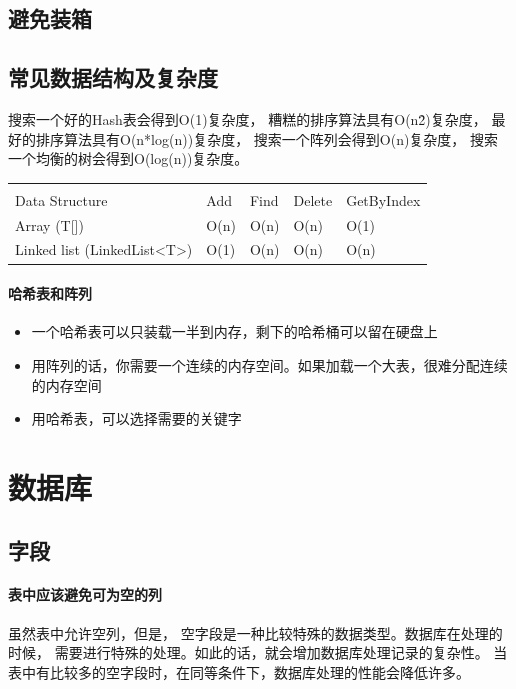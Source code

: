 \documentclass{book}
\begin{document}
\subsection{避免装箱}

\subsection{常见数据结构及复杂度}

搜索一个好的Hash表会得到O(1)复杂度，
糟糕的排序算法具有O(n\^2)复杂度，
最好的排序算法具有O(n*log(n))复杂度，
搜索一个阵列会得到O(n)复杂度，
搜索一个均衡的树会得到O(log(n))复杂度。 

\begin{tabular}{l|l|l|l|l}
	\multirow{1}{*}{}			
	& \multicolumn{1}{c}{}
	& \multicolumn{1}{c}{}
	& \multicolumn{1}{c}{}
	& \multicolumn{1}{c}{}\\
	Data Structure & Add & Find & Delete & GetByIndex\\
	\hline
	Array (T[]) & O(n) & O(n) & O(n) & O(1)\\
	\hline
	Linked list (LinkedList<T>) & O(1) & O(n) & O(n) & O(n)\\
\end{tabular}

\paragraph{哈希表和阵列}

\begin{itemize}
	\item{一个哈希表可以只装载一半到内存，剩下的哈希桶可以留在硬盘上}
	\item{用阵列的话，你需要一个连续的内存空间。如果加载一个大表，很难分配连续的内存空间}
	\item{用哈希表，可以选择需要的关键字}
\end{itemize}

\section{数据库}

\subsection{字段}

\paragraph{表中应该避免可为空的列}虽然表中允许空列，但是，
空字段是一种比较特殊的数据类型。数据库在处理的时候，
需要进行特殊的处理。如此的话，就会增加数据库处理记录的复杂性。
当表中有比较多的空字段时，在同等条件下，数据库处理的性能会降低许多。
\end{document}
